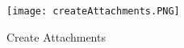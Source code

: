  \subparagraph*{}
 \begin{figure}[h!]
 \centering
     \texttt{[image: createAttachments.PNG]}
 \caption{Create Attachments}
 \end{figure}
 \clearpage
%
%
%
%
%
%
%
%
%
%
%
%
%
%
